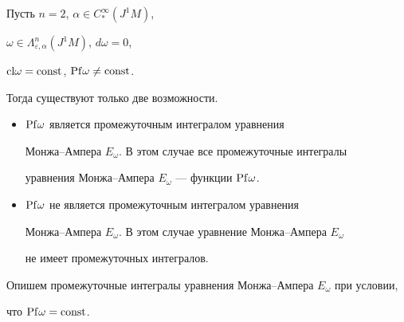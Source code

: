 \begin{prop}


Пусть $n=2$, $\alpha \in C_{*}^\infty (J^1M)$,


$\omega \in \Lambda_{\varepsilon ,\alpha }^n(J^1M)$, $d\omega =0$,


${\operatorname{cl}}\omega ={\operatorname{const}}$, ${\operatorname{Pf}}\omega \neq {\operatorname{const}}$.


Тогда существуют только две возможности.


\begin{itemize}


\item[1.] ${\operatorname{Pf}}\omega$ является промежуточным интегралом уравнения 


Монжа--Ампера $E_\omega$. В этом случае все промежуточные интегралы 


уравнения Монжа--Ампера $E_\omega $ --- функции ${\operatorname{Pf}}\omega$.


\item[2.] ${\operatorname{Pf}}\omega$ не является промежуточным интегралом уравнения 


Монжа--Ампера $E_\omega$. В этом случае уравнение Монжа--Ампера $E_\omega$


не имеет промежуточных интегралов.


\end{itemize}


\end{prop}





Опишем промежуточные интегралы уравнения Монжа--Ампера $E_\omega$ при условии,


что ${\operatorname{Pf}}\omega ={\operatorname{const}}$.





